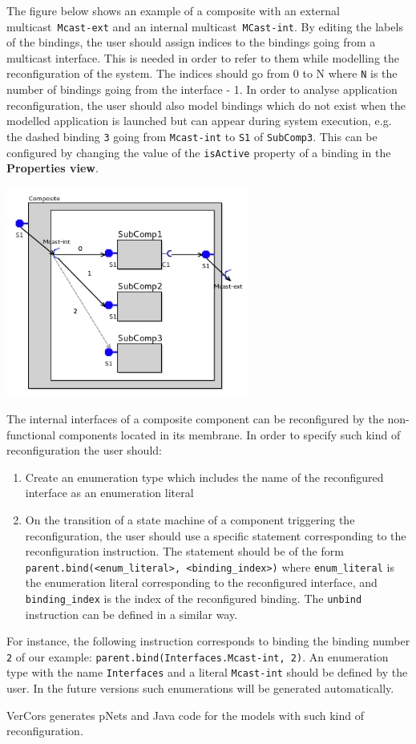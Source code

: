 \documentclass[12pt]{article}
\begin{document}
The figure below shows an example of a composite with an external multicast~\texttt{Mcast-ext} and an internal multicast~\texttt{MCast-int}. By editing the labels of the bindings, the user should assign indices to the bindings going from a multicast interface. This is needed in order to refer to them while modelling the reconfiguration of the  system. The indices should go from 0 to N where \texttt{N} is the number of bindings going from the interface - 1. In order to analyse application reconfiguration, the user should also model bindings which do not exist when the modelled application is launched but can appear during system execution, e.g. the dashed binding \texttt{3} going from \texttt{Mcast-int} to \texttt{S1} of \texttt{SubComp3}. This can be configured by changing the value of the \texttt{isActive} property of a binding in the \textbf{Properties view}.

     \centerline{
    \includegraphics[width=8cm]{draws/mcast-compos-vce.jpg}
     }

The internal interfaces of a composite component can be reconfigured by the non-functional components located in its membrane. In order to specify such kind of reconfiguration the user should:

\begin{enumerate}
\item
Create an enumeration type which includes the name of the reconfigured interface as an enumeration literal
\item
On the transition of a state machine of a component triggering the reconfiguration, the user should use a specific statement corresponding to the reconfiguration instruction.
The statement should be of the form \texttt{parent.bind(<enum\_literal>, <binding\_index>)} where \texttt{enum\_literal} is the enumeration literal corresponding to the reconfigured interface, and \texttt{binding\_index} is the index of the reconfigured binding. The \texttt{unbind} instruction can be defined in a similar way.
\end{enumerate}

For instance, the following instruction corresponds to binding the binding number \texttt{2} of our example: \texttt{parent.bind(Interfaces.Mcast-int, 2)}. An enumeration type with the name \texttt{Interfaces} and a literal \texttt{Mcast-int} should be defined by the user. In the future versions such enumerations will be generated automatically.

VerCors generates pNets and Java code for the models with such kind of reconfiguration.
\end{document}
